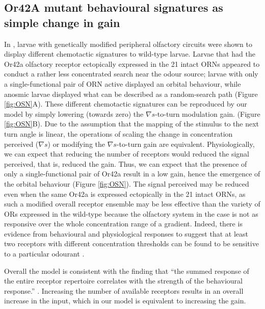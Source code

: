 \documentclass[11pt,a4paper]{article}
\begin{document}
\subsection{Or42A mutant behavioural signatures as simple change in gain}
In \cite{gomez2011active}, larvae with genetically modified peripheral olfactory circuits were shown to display different chemotactic signatures to wild-type larvae.
 Larvae that had the Or42a olfactory receptor ectopically expressed in the 21 intact ORNs appeared to conduct a rather less concentrated search near the odour source; larvae with only a single-functional pair of ORN active displayed an orbital behaviour, while anosmic larvae displayed what can be described as a random-search path (Figure \ref{fig:OSN}A).
 These different chemotactic signatures can be reproduced by our model by simply lowering (towards zero) the $\nabla s$-to-turn modulation gain. 
 (Figure \ref{fig:OSN}B).
 Due to the assumption that the mapping of the stimulus to the next turn angle is linear, the operations of scaling the change in concentration perceived ($\nabla s$) or modifying the $\nabla s$-to-turn gain are equivalent. Physiologically, we can expect that reducing the number of receptors would reduced the signal perceived, that is, reduced the gain. Thus, we can expect that the presence of only a single-functional pair of Or42a result in a low gain, hence the emergence of the orbital behaviour (Figure \ref{fig:OSN}).
 The signal perceived may be reduced even when the same Or42a is expressed ectopically in the 21 intact ORNs, as such a modified overall receptor ensemble may be less effective than the variety of ORs expressed in the wild-type because the olfactory system in the case is not as responsive over the whole concentration range of a gradient. Indeed, there is evidence from behavioural and physiological responses to suggest that at least two receptors with different concentration thresholds can be found to be sensitive to a particular odourant \citep{kreher2008translation}. 

Overall the model is consistent with the finding that ``the summed response of the entire receptor repertoire correlates with the strength of the behavioural response.” \citep{kreher2008translation}. Increasing the number of available receptors results in an overall increase in the input, which in our model is equivalent to increasing the gain.
\end{document}
